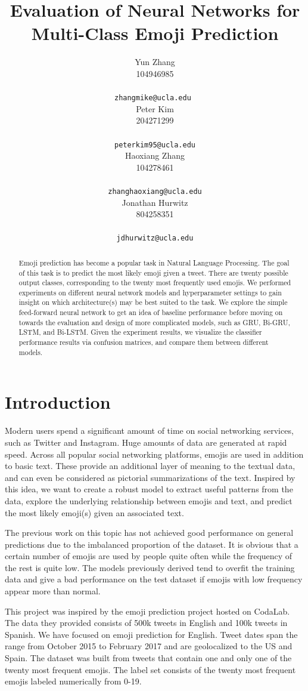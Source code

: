 \documentclass[11pt,a4paper]{article}
\title{Evaluation of Neural Networks for Multi-Class Emoji Prediction}
\author{Yun Zhang \\
	 104946985 \\
	 \\
	\small{\tt zhangmike@ucla.edu } \\\And
	Peter Kim \\
	204271299 \\
	 \\
	\small{\tt peterkim95@ucla.edu} \\\And
	Haoxiang Zhang \\
	104278461 \\
	 \\
	\small{\tt zhanghaoxiang@ucla.edu} \\\And
	 Jonathan Hurwitz \\
	 804258351 \\
	 \\
	\small{\tt jdhurwitz@ucla.edu} \\
}
\date{}
\begin{document}
	\maketitle
	\begin{abstract}
	Emoji prediction has become a popular task in Natural Language Processing. The goal of this task is to predict the most likely emoji given a tweet. There are twenty possible output classes, corresponding to the twenty most frequently used emojis. We performed experiments on different neural network models and hyperparameter settings to gain insight on which architecture(s) may be best suited to the task. We explore the simple feed-forward neural network to get an idea of baseline performance before moving on towards the evaluation and design of more complicated models, such as GRU, Bi-GRU, LSTM, and Bi-LSTM. Given the experiment results, we visualize the classifier performance results via confusion matrices, and compare them between different models.
	\end{abstract}
	
	\section{Introduction}
	
	Modern users spend a significant amount of time on social networking services, such as Twitter and Instagram. Huge amounts of data are generated at rapid speed. Across all popular social networking platforms, emojis are used in addition to basic text. These provide an additional layer of meaning to the textual data, and can even be considered as pictorial summarizations of the text. Inspired by this idea, we want to create a robust model to extract useful patterns from the data, explore the underlying relationship between emojis and text, and predict the most likely emoji(s) given an associated text.
	\par
	The previous work on this topic has not achieved good performance on general predictions due to the imbalanced proportion of the dataset. It is obvious that a certain number of emojis are used by people quite often while the frequency of the rest is quite low. The models previously derived tend to overfit the training data and give a bad performance on the test dataset if emojis with low frequency appear more than normal.
	\par
	This project was inspired by the emoji prediction project hosted on CodaLab. The data they provided consists of 500k tweets in English and 100k tweets in Spanish. We have focused on emoji prediction for English. Tweet dates span the range from October 2015 to February 2017 and are geolocalized to the US and Spain. The dataset was built from tweets that contain one and only one of the twenty most frequent emojis. The label set consists of the twenty most frequent emojis labeled numerically from 0-19.
	
\end{document}

